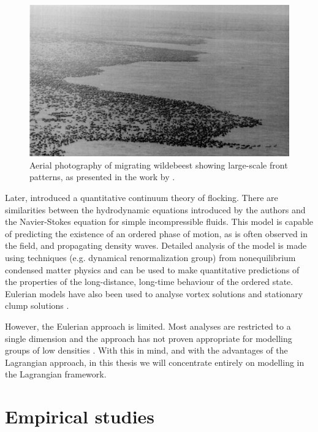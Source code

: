 \begin{figure}[tb]
    \includegraphics[width=\textwidth]{wildebeest.png}
    \caption{Aerial photography of migrating wildebeest showing large-scale
      front patterns, as presented in the work by \textcite{gueron93}.}
    \label{fig:wildebeest}
\end{figure}

Later, \textcite{toner98} introduced a quantitative continuum theory of
flocking. There are similarities between the hydrodynamic equations introduced
by the authors and the Navier-Stokes equation for simple incompressible fluids.
This model is capable of predicting the existence of an ordered phase of
motion, as is often observed in the field, and propagating density waves.
Detailed analysis of the model is made using techniques (e.g. dynamical
renormalization group) from nonequilibrium condensed matter physics and can be
used to make quantitative predictions of the properties of the long-distance,
long-time behaviour of the ordered state. Eulerian models have also been used
to analyse vortex solutions \parencite{topaz04} and stationary clump solutions
\parencite{topaz06}.

However, the Eulerian approach is limited. Most analyses are restricted to a
single dimension and the approach has not proven appropriate for modelling
groups of low densities \parencite{giardina08}. With this in mind, and with the
advantages of the Lagrangian approach, in this thesis we will concentrate
entirely on modelling in the Lagrangian framework.

\section{Empirical studies} \label{sec:empirical_studies}

